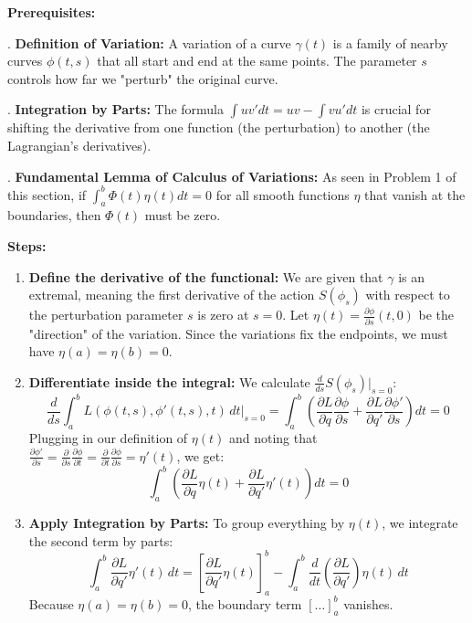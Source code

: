 \begin{solution}
\textbf{Prerequisites:}
\par{}. \textbf{Definition of Variation:} A variation of a curve $\gamma(t)$ is a family of nearby curves $\phi(t,s)$ that all start and end at the same points. The parameter $s$ controls how far we "perturb" the original curve.
\par{}. \textbf{Integration by Parts:} The formula $\int u v' dt = uv - \int v u' dt$ is crucial for shifting the derivative from one function (the perturbation) to another (the Lagrangian's derivatives).
\par{}. \textbf{Fundamental Lemma of Calculus of Variations:} As seen in Problem 1 of this section, if $\int_a^b \Phi(t) \eta(t) dt = 0$ for all smooth functions $\eta$ that vanish at the boundaries, then $\Phi(t)$ must be zero.
\par\medskip
\textbf{Steps:}
\begin{enumerate}
    \item \textbf{Define the derivative of the functional:} We are given that $\gamma$ is an extremal, meaning the first derivative of the action $S(\phi_s)$ with respect to the perturbation parameter $s$ is zero at $s=0$. 
    Let $\eta(t) = \frac{\partial \phi}{\partial s}(t,0)$ be the "direction" of the variation. Since the variations fix the endpoints, we must have $\eta(a) = \eta(b) = 0$.

    \item \textbf{Differentiate inside the integral:} We calculate $\frac{d}{ds} S(\phi_s)|_{s=0}$:
    \[ \frac{d}{ds} \int_a^b L(\phi(t,s), \phi'(t,s), t) \, dt \bigg|_{s=0} = \int_a^b \left( \frac{\partial L}{\partial q} \frac{\partial \phi}{\partial s} + \frac{\partial L}{\partial q'} \frac{\partial \phi'}{\partial s} \right) dt = 0 \]
    Plugging in our definition of $\eta(t)$ and noting that $\frac{\partial \phi'}{\partial s} = \frac{\partial}{\partial s} \frac{\partial \phi}{\partial t} = \frac{\partial}{\partial t} \frac{\partial \phi}{\partial s} = \eta'(t)$, we get:
    \[ \int_a^b \left( \frac{\partial L}{\partial q} \eta(t) + \frac{\partial L}{\partial q'} \eta'(t) \right) dt = 0 \]

    \item \textbf{Apply Integration by Parts:} To group everything by $\eta(t)$, we integrate the second term by parts:
    \[ \int_a^b \frac{\partial L}{\partial q'} \eta'(t) \, dt = \left[ \frac{\partial L}{\partial q'} \eta(t) \right]_a^b - \int_a^b \frac{d}{dt} \left( \frac{\partial L}{\partial q'} \right) \eta(t) \, dt \]
    Because $\eta(a) = \eta(b) = 0$, the boundary term $[\dots]_a^b$ vanishes.


\end{enumerate}
\end{solution}
